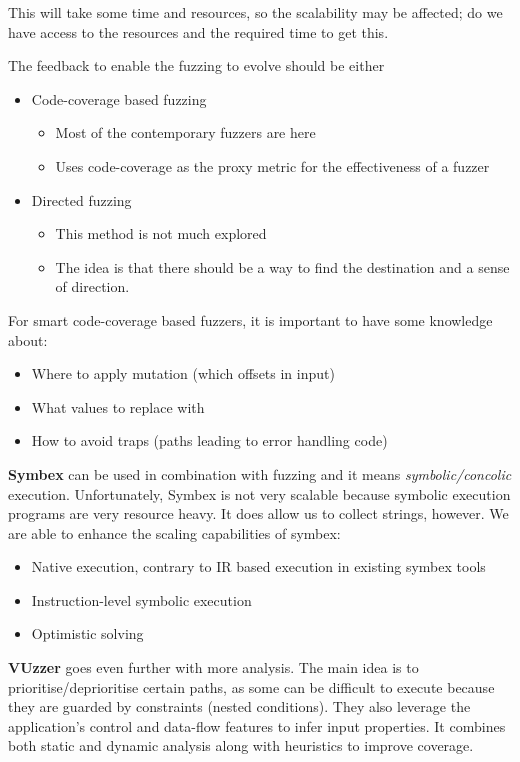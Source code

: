 \documentclass[11pt,a4paper,titlepage,dvipsnames,cmyk]{scrartcl}
\begin{document}
This will take some time and resources, so the scalability may be affected; do we have access to the resources and the required time to get this.

The feedback to enable the fuzzing to evolve should be either
\begin{itemize}
    \item Code-coverage based fuzzing
    \begin{itemize}
        \item Most of the contemporary fuzzers are here
        \item Uses code-coverage as the proxy metric for the effectiveness of a fuzzer
    \end{itemize}
    \item Directed fuzzing
    \begin{itemize}
        \item This method is not much explored
        \item The idea is that there should be a way to find the destination and a sense of direction.
    \end{itemize}
\end{itemize}

For smart code-coverage based fuzzers, it is important to have some knowledge about:
\begin{itemize}
    \item Where to apply mutation (which offsets in input)
    \item What values to replace with
    \item How to avoid traps (paths leading to error handling code)
\end{itemize}

\textbf{Symbex} can be used in combination with fuzzing and it means \textit{symbolic/concolic} execution. Unfortunately, Symbex is not very scalable because symbolic execution programs are very resource heavy. It does allow us to collect strings, however. We are able to enhance the scaling capabilities of symbex:
\begin{itemize}
    \item Native execution, contrary to IR based execution in existing symbex tools
    \item Instruction-level symbolic execution
    \item Optimistic solving
\end{itemize}

\textbf{VUzzer} goes even further with more analysis. The main idea is to prioritise/deprioritise certain paths, as some can be difficult to execute because they are guarded by constraints (nested conditions). They also leverage the application's control and data-flow features to infer input properties. It combines both static and dynamic analysis along with heuristics to improve coverage.
\end{document}
